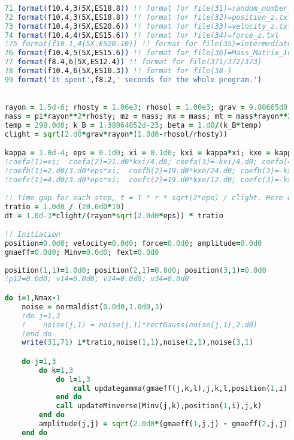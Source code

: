 \documentclass[fleqn,10pt]{InternshipReport_SI-ENS-PSL}
\begin{document}
\begin{lstlisting}[language=Fortran, caption=BEHD\_YYE.f90]
    
    71 format(f10.4,3(5X,ES18.8)) !! format for file(31)=random_number_test.txt
    72 format(f10.4,3(5X,ES18.8)) !! format for file(32)=position_z.txt
    73 format(f10.4,3(5X,ES20.6)) !! format for file(33)=velocity_z.txt
    74 format(f10.4,4(5X,ES15.6)) !! format for file(34)=force_z.txt
    !75 format(f10.1,4(5X,ES20.10)) !! format for file(35)=intermediates.txt
    76 format(f10.4,5(5X,ES15.6)) !! format for file(36)=Mass_Matrix_Inverse.txt
    77 format(f8.4,6(5X,ES12.4)) !! format for file(371/372/373)
    78 format(f10.4,6(5X,ES10.3)) !! format for file(38-)
    99 format('It spent',f8.2,' seconds for the whole program.')
    

    rayon = 1.5d-6; rhosty = 1.06e3; rhosol = 1.00e3; grav = 9.80665d0
    mass = pi*rayon**2*rhosty; mz = mass; mx = mass; mt = mass*rayon**2/2; masse(1)=mz; masse(2)=mx; masse(3)=mt
    temp = 298.0d0; k_B = 1.38064852d-23; beta = 1.d0/(k_B*temp)
    clight = sqrt(2.d0*grav*rayon*(1.0d0-rhosol/rhosty))

    kappa = 1.0d-4; eps = 0.1d0; xi = 0.1d0; kxi = kappa*xi; kxe = kappa*xi*eps
    !coefa(1)=xi;  coefa(2)=21.d0*kxi/4.d0; coefa(3)=-kxi/4.d0; coefa(4)=kxi/2.d0; coefa(5)=-15.d0*kxi/8.d0; coefa(6)=1.d0
    !coefb(1)=2.d0/3.d0*eps*xi;  coefb(2)=19.d0*kxe/24.d0; coefb(3)=-kxe/6.d0; coefb(4)=kxe/12.d0; coefb(5)=-kxe/12.d0; coefb(6)=0.d0
    !coefc(1)=4.d0/3.d0*eps*xi;  coefc(2)=19.d0*kxe/12.d0; coefc(3)=-kxe/3.d0; coefc(4)=kxe/6.0d0; coefc(5)=-kxe/6.0d0; coefc(6)=0.d0
    
    !! Time gap for each step, t = T * r * sqrt(2*eps) / clight. Here we pose dt ~ ∆T
    tratio = 1.0d0 / (20.0d0*10)
    dt = 1.0d-3*clight/(rayon*sqrt(2.0d0*eps)) * tratio

    !! Initiation 
    position=0.0d0; velocity=0.0d0; force=0.0d0; amplitude=0.0d0
    gmaeff=0.0d0; Minv=0.0d0; fext=0.0d0
    
    position(1,1)=1.0d0; position(2,1)=0.0d0; position(3,1)=0.0d0
    !p12=0.0d0; v14=0.0d0; v24=0.0d0; v34=0.0d0

    do i=1,Nmax-1
        noise = normaldist(0.0d0,1.0d0,3)
        !do j=1,3
        !    noise(j,1) = noise(j,1)*rectGauss(noise(j,1),2.d0)
        !end do
        write(31,71) i*tratio,noise(1,1),noise(2,1),noise(3,1)

        do j=1,3
            do k=1,3
                do l=1,3
                    call updategamma(gmaeff(j,k,l),j,k,l,position(1,i),velocity(1,i),velocity(2,i),velocity(3,i))
                end do
                call updateMinverse(Minv(j,k),position(1,i),j,k)
            end do
            amplitude(j,j) = sqrt(2.0d0*(gmaeff(1,j,j) - gmaeff(2,j,j))/(beta*masse(j)))
        end do



\end{lstlisting}
\end{document}
